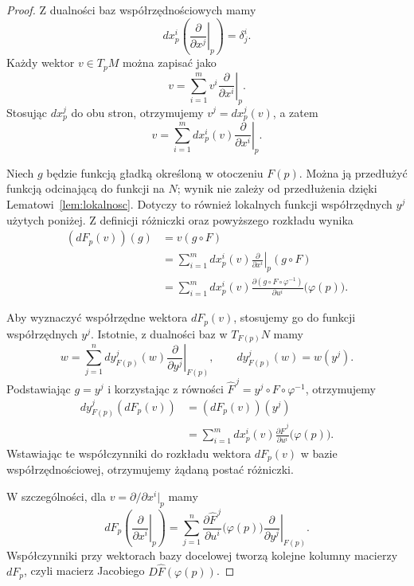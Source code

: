 \begin{proof}
Z dualności baz współrzędnościowych mamy
\[
dx_p^i\left(
\left.\frac{\partial}{\partial x^j}\right|_p
\right)=\delta_j^i.
\]
Każdy wektor $v\in T_pM$ można zapisać jako
\[
v=\sum_{i=1}^m v^i
\left.\frac{\partial}{\partial x^i}\right|_p.
\]
Stosując $dx_p^j$ do obu stron, otrzymujemy
$v^j=dx_p^j(v)$, a zatem
\[
v=\sum_{i=1}^m dx_p^i(v)
\left.\frac{\partial}{\partial x^i}\right|_p.
\]

Niech $g$ będzie funkcją gładką określoną w otoczeniu
$F(p)$. Można ją przedłużyć funkcją odcinającą do funkcji
na $N$; wynik nie zależy od przedłużenia dzięki
Lematowi~\ref{lem:lokalnosc}. Dotyczy to również
lokalnych funkcji współrzędnych $y^j$ użytych poniżej.
Z definicji różniczki oraz powyższego rozkładu
wynika
\[
\begin{aligned}
(dF_p(v))(g)
&=v(g\circ F)\\
&=\sum_{i=1}^m dx_p^i(v)
\left.\frac{\partial}{\partial x^i}\right|_p(g\circ F)\\
&=\sum_{i=1}^m dx_p^i(v)
\frac{\partial(g\circ F\circ\varphi^{-1})}
{\partial u^i}\bigl(\varphi(p)\bigr).
\end{aligned}
\]

Aby wyznaczyć współrzędne wektora $dF_p(v)$,
stosujemy go do funkcji współrzędnych $y^j$.
Istotnie, z dualności baz w $T_{F(p)}N$ mamy
\[
w=\sum_{j=1}^n dy_{F(p)}^j(w)
\left.\frac{\partial}{\partial y^j}\right|_{F(p)},
\qquad
dy_{F(p)}^j(w)=w(y^j).
\]
Podstawiając $g=y^j$ i korzystając z równości
$\widehat F^{\,j}=y^j\circ F\circ\varphi^{-1}$,
otrzymujemy
\[
\begin{aligned}
dy_{F(p)}^j(dF_p(v))
&=(dF_p(v))(y^j)\\
&=\sum_{i=1}^m dx_p^i(v)
\frac{\partial\widehat F^{\,j}}{\partial u^i}
\bigl(\varphi(p)\bigr).
\end{aligned}
\]
Wstawiając te współczynniki do rozkładu wektora
$dF_p(v)$ w bazie współrzędnościowej, otrzymujemy
żądaną postać różniczki.

W szczególności, dla
$v=\partial/\partial x^i|_p$ mamy
\[
dF_p\left(
\left.\frac{\partial}{\partial x^i}\right|_p
\right)
=
\sum_{j=1}^n
\frac{\partial\widehat F^{\,j}}{\partial u^i}
\bigl(\varphi(p)\bigr)
\left.\frac{\partial}{\partial y^j}\right|_{F(p)}.
\]
Współczynniki przy wektorach bazy docelowej
tworzą kolejne kolumny macierzy $dF_p$,
czyli macierz Jacobiego $D\widehat F(\varphi(p))$.
\end{proof}

